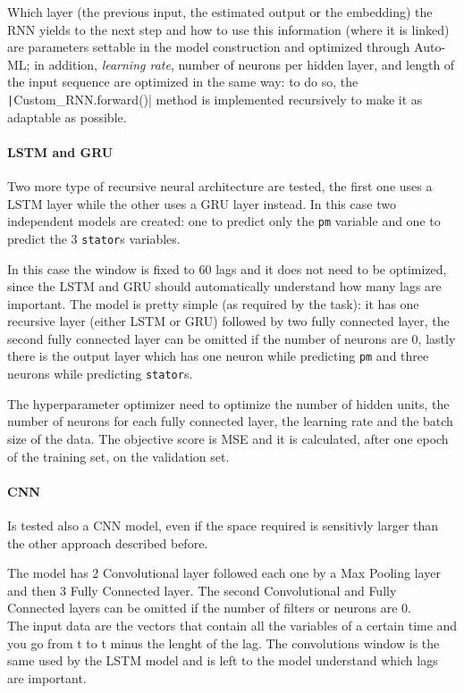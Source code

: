 Which layer (the previous input, the estimated output or the embedding) the RNN yields to the next step and how to use this information (where it is linked) are parameters settable in the model construction and optimized through Auto-ML; in addition, \textit{learning rate}, number of neurons per hidden layer, and length of the input sequence are optimized in the same way: to do so, the \texttt|Custom_RNN.forward()| method is implemented recursively to make it as adaptable as possible.

\paragraph{LSTM and GRU}
Two more type of recursive neural architecture are tested, the first one uses a LSTM layer while the other uses a GRU layer instead.
In this case two independent models are created: one to predict only the \verb|pm| variable and one to predict the 3 \verb|stator|s variables.

In this case the window is fixed to 60 lags and it does not need to be optimized, since the LSTM and GRU should automatically understand how many lags are important.
The model is pretty simple (as required by the task): it has one recursive layer (either LSTM or GRU) followed by two fully connected layer, the second fully connected layer can be omitted if the number of neurons are 0, lastly there is the output layer which has one neuron while predicting \verb|pm| and three neurons while predicting \verb|stator|s.

The hyperparameter optimizer need to optimize the number of hidden units, the number of neurons for each fully connected layer, the learning rate and the batch size of the data.
The objective score is MSE and it is calculated, after one epoch of the training set, on the validation set.

\paragraph{CNN}
Is tested also a CNN model, even if the space required is sensitivly larger than the other approach described before.

The model has 2 Convolutional layer followed each one by a Max Pooling layer and then 3 Fully Connected layer. The second Convolutional and Fully Connected layers can be omitted if the number of filters or neurons are 0.\\ 
The input data are the vectors that contain all the variables of a certain time and you go from t to t minus the lenght of the lag. The convolutions window is the same used by the LSTM model and is left to the model understand which lags are important.

